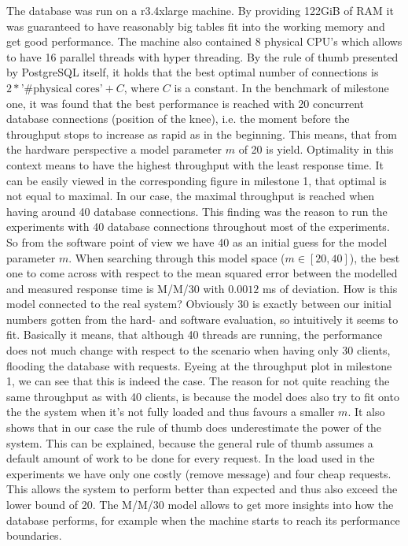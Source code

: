 \documentclass[11pt]{article}
\begin{document}
The database was run on a r3.4xlarge machine. By providing 122GiB of RAM it was guaranteed to have reasonably big tables fit into the working memory and get good performance. The machine also contained 8 physical CPU's which allows to have 16 parallel threads with hyper threading. By the rule of thumb presented by PostgreSQL itself, it holds that the best optimal number of connections is $2*\text{'\#physical cores'}+C$, where $C$ is a constant. In the benchmark of milestone one, it was found that the best performance is reached with 20 concurrent database connections (position of the knee), i.e. the moment before the throughput stops to increase as rapid as in the beginning. This means, that from the hardware perspective a model parameter $m$ of 20 is yield. Optimality in this context means to have the highest throughput with the least response time. It can be easily viewed in the corresponding figure in milestone 1, that optimal is not equal to maximal. In our case, the maximal throughput is reached when having around 40 database connections. This finding was the reason to run the experiments with 40 database connections throughout most of the experiments. So from the software point of view we have 40 as an initial guess for the model parameter $m$. When searching through this model space ($m\in[20, 40]$), the best one to come across with respect to the mean squared error between the modelled and measured response time is M/M/30 with $0.0012$ ms of deviation. How is this model connected to the real system? Obviously 30 is exactly between our initial numbers gotten from the hard- and software evaluation, so intuitively it seems to fit. Basically it means, that although 40 threads are running, the performance does not much change with respect to the scenario when having only 30 clients, flooding the database with requests. Eyeing at the throughput plot in milestone 1, we can see that this is indeed the case. The reason for not quite reaching the same throughput as with 40 clients, is because the model does also try to fit onto the the system when it's not fully loaded and thus favours a smaller $m$. It also shows that in our case the rule of thumb does underestimate the power of the system. This can be explained, because the general rule of thumb assumes a default amount of work to be done for every request. In the load used in the experiments we have only one costly (remove message) and four cheap requests. This allows the system to perform better than expected and thus also exceed the lower bound of 20. The M/M/30 model allows to get more insights into how the database performs, for example when the machine starts to reach its performance boundaries.
\end{document}
